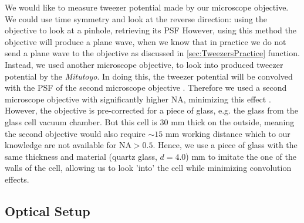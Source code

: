 We would like to measure tweezer potential made by our microscope objective. 
We could use time symmetry and look at the reverse direction: using the objective to look at a pinhole, retrieving its \acf{PSF} \cite{Knottnerus2018,Sortais2007}
However, using this method the objective will produce a plane wave, when we know that in practice we do not send a plane wave to the objective as discussed in \cref{sec:TweezersPractice}
function. 
Instead, we used another microscope objective, to look into produced tweezer potential by the \textit{Mitutoyo}. 
In doing this, the tweezer potential will be convolved with the \ac{PSF} of the second microscope objective \cite{Baumgaertner2017}.
Therefore we used a second microscope objective with significantly higher \ac{NA}, minimizing this effect \cite{Baumgaertner2017}. 
However, the objective is pre-corrected for a piece of glass, e.g. the glass from the glass cell vacuum chamber. 
But this cell is 30 mm thick on the outside, meaning the second objective would also require $\sim 15$ mm working distance which to our knowledge are not available for $\text{NA}>0.5$.
Hence, we use a piece of glass with the same thickness and material (quartz glass, $d = 4.0$) mm to imitate the one of the walls of the cell, allowing us to look 'into' the cell while minimizing convolution effects.

\subsection{Optical Setup}

